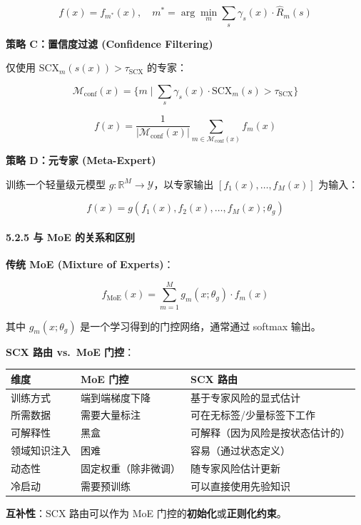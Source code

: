 \documentclass[
  12pt,
]{ctexart}
\begin{document}
\[
f(x) = f_{m^*}(x), \quad m^* = \arg\min_m \sum_s \gamma_s(x) \cdot \hat{R}_m(s)
\]

\textbf{策略 C：置信度过滤 (Confidence Filtering)}

仅使用 \(\text{SCX}_m(s(x)) > \tau_{\text{SCX}}\) 的专家：

\[
\mathcal{M}_{\text{conf}}(x) = \{ m \mid \sum_s \gamma_s(x) \cdot \text{SCX}_m(s) > \tau_{\text{SCX}} \}
\]

\[
f(x) = \frac{1}{|\mathcal{M}_{\text{conf}}(x)|} \sum_{m \in \mathcal{M}_{\text{conf}}(x)} f_m(x)
\]

\textbf{策略 D：元专家 (Meta-Expert)}

训练一个轻量级元模型 \(g: \mathbb{R}^M \to \mathcal{Y}\)，以专家输出
\([f_1(x), \dots, f_M(x)]\) 为输入：

\[
f(x) = g(f_1(x), f_2(x), \dots, f_M(x); \theta_g)
\]

\paragraph{5.2.5 与 MoE
的关系和区别}\label{ux4e0e-moe-ux7684ux5173ux7cfbux548cux533aux522b}

\textbf{传统 MoE (Mixture of Experts)}：

\[
f_{\text{MoE}}(x) = \sum_{m=1}^M g_m(x; \theta_g) \cdot f_m(x)
\]

其中 \(g_m(x; \theta_g)\) 是一个学习得到的门控网络，通常通过 softmax
输出。

\textbf{SCX 路由 vs.~MoE 门控}：

\begin{longtable}[]{@{}lll@{}}
\toprule\noalign{}
维度 & MoE 门控 & SCX 路由 \\
\midrule\noalign{}
\endhead
\bottomrule\noalign{}
\endlastfoot
训练方式 & 端到端梯度下降 & 基于专家风险的显式估计 \\
所需数据 & 需要大量标注 & 可在无标签/少量标签下工作 \\
可解释性 & 黑盒 & 可解释（因为风险是按状态估计的） \\
领域知识注入 & 困难 & 容易（通过状态定义） \\
动态性 & 固定权重（除非微调） & 随专家风险估计更新 \\
冷启动 & 需要预训练 & 可以直接使用先验知识 \\
\end{longtable}

\textbf{互补性}：SCX 路由可以作为 MoE
门控的\textbf{初始化}或\textbf{正则化约束}。
\end{document}
